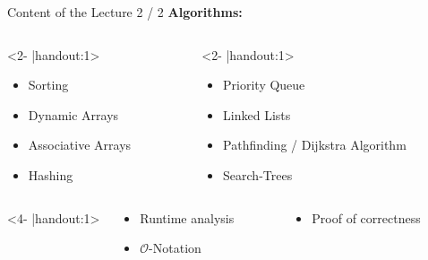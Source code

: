\begin{frame}{Content of the Lecture 2 / 2}
  \textbf{Algorithms:}
  \begin{columns}
    \begin{column}{0.40\textwidth}<2- |handout:1>
      \begin{itemize}
        \item
          Sorting
        \item
          Dynamic Arrays
        \item
          Associative Arrays
        \item
          Hashing
      \end{itemize}
    \end{column}
    \begin{column}{0.60\textwidth}<2- |handout:1>
      \begin{itemize}
        \item
          Priority Queue
        \item
          Linked Lists
        \item
          Pathfinding / Dijkstra Algorithm
        \item
          Search-Trees
      \end{itemize}
    \end{column}
  \end{columns}
  \vspace*{2.0em}
  \begin{columns}<4- |handout:1>
    \begin{column}{0.40\textwidth}
      \begin{itemize}
        \item
          Runtime analysis
        \item
          $\mathcal{O}$-Notation
      \end{itemize}
    \end{column}
    \begin{column}{0.60\textwidth}
      \begin{itemize}
        \item
          Proof of correctness
          \vspace*{1.5em}
      \end{itemize}
    \end{column}
  \end{columns}
\end{frame}